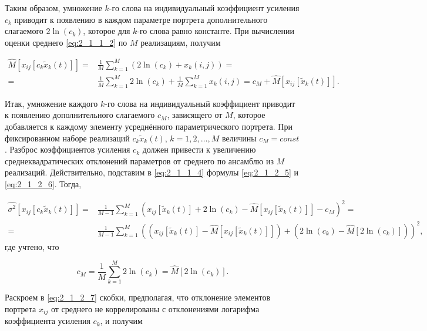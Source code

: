 Таким образом, умножение $k$-го слова на индивидуальный коэффициент усиления $c_k$ приводит к появлению в каждом параметре портрета дополнительного слагаемого $2 \ln(c_k)$, которое для $k$-го слова равно константе.
При вычислении оценки среднего \eqref{eq:2_1_1_2} по $M$ реализациям, получим

\begin{equation} \label{eq:2_1_2_6}
\begin{split}
\widehat{M} [x_{ij} [c_k \tilde{x}_k(t)]] = &
\frac{1}{M} \sum_{k=1}^M (2 \ln(c_k) + x_k(i,j)) = \\
= & \frac{1}{M} \sum_{k=1}^M 2 \ln(c_k) + \frac{1}{M} \sum_{k=1}^M x_k(i,j) =
c_M + \widehat{M} [x_{ij} [\tilde{x}_k(t)]].
\end{split}
\end{equation}

Итак, умножение каждого $k$-го слова на индивидуальный коэффициент приводит к появлению дополнительного слагаемого $c_M$, зависящего от $M$, которое добавляется к каждому элементу усреднённого параметрического портрета.
При фиксированном наборе реализаций $c_k \tilde{x}_k(t)$, $k = 1, 2, \dots, M$ величины $c_M = const$.
Разброс коэффициентов усиления $c_k$ должен привести к увеличению среднеквадратических отклонений параметров от среднего по ансамблю из $M$ реализаций.
Действительно, подставим в \eqref{eq:2_1_1_4} формулы \eqref{eq:2_1_2_5} и \eqref{eq:2_1_2_6}. Тогда,

\begin{equation} \label{eq:2_1_2_7}
\begin{split}
\widehat{\sigma^2} [x_{ij} [c_k \tilde{x}_k(t)]] = &
\frac{1}{M-1} \sum_{k=1}^M (x_{ij}[\tilde{x}_k(t)] + 2 \ln(c_k) - \widehat{M} [x_{ij}[\tilde{x}_k(t)]] - c_M)^2 = \\
= & \frac{1}{M-1} \sum_{k=1}^M ((x_{ij}[\tilde{x}_k(t)] - \widehat{M} [x_{ij}[\tilde{x}_k(t)]]) + (2 \ln(c_k) - \widehat{M}[2 \ln(c_k)]))^2,
\end{split}
\end{equation}
где учтено, что

\begin{equation} \label{eq:2_1_2_8}
c_M = \frac{1}{M} \sum_{k=1}^M 2 \ln(c_k) = \widehat{M}[2 \ln(c_k)].
\end{equation}

Раскроем в \eqref{eq:2_1_2_7} скобки, предполагая, что отклонение элементов портрета $x_{ij}$ от среднего не коррелированы с отклонениями логарифма коэффициента усиления $c_k$, и получим


